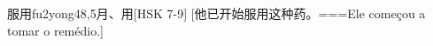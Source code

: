 \begin{EntryWithPhonetic}{服用}{fu2yong4}{8,5}{⽉、⽤}[HSK 7-9]
  [他已开始服用这种药。===Ele começou a tomar o remédio.]
\end{EntryWithPhonetic}
